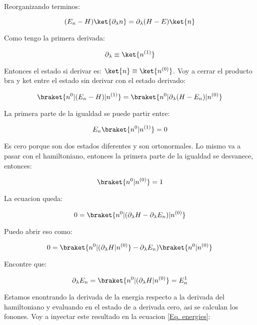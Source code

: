 \documentclass[11pt,fleqn]{book}
\begin{document}
Reorganizando terminos:

\begin{equation}
    (E_{n}-H)\ket{\partial_{\lambda}n}=\partial_{\lambda}(H-E)\ket{n}
    \label{Eq. energies}
\end{equation}

Como tengo la primera derivada:

\begin{equation*}
    \partial_{\lambda}\equiv\ket{n^{(1)}}
\end{equation*}

Entonces el estado si derivar es: $\ket{n}\equiv\ket{n^{(0)}}$. Voy a cerrar el producto bra y ket entre el estado sin derivar con el estado derivado:

\begin{equation}
    \braket{n^{0}|(E_{n}-H)|n^{(1)}}=\braket{n^{0}|\partial_{\lambda}(H-E_{n})|n^{(0)}}
\end{equation}

La primera parte de la igualdad se puede partir entre:

\begin{equation*}
    E_{n}\braket{n^{0}|n^{(1)}}=0
\end{equation*}

Es cero porque son dos estados diferentes y son ortonormales. Lo mismo va a pasar con el hamiltoniano, entonces la primera parte de la igualdad se desvanece, entonces:

\begin{equation*}
    \braket{n^{0}|n^{(0)}}=1
\end{equation*}

La ecuacion queda:

\begin{equation}
    0=\braket{n^{0}|(\partial_{\lambda}H-\partial_{\lambda}E_{n})|n^{(0)}}
\end{equation}

Puedo abrir eso como:

\begin{equation}
     0=\braket{n^{0}|(\partial_{\lambda}H|n^{(0)}}-\partial_{\lambda}E_{n})\braket{n^{0}|n^{(0)}}
\end{equation}

Encontre que:

\begin{equation}
    \partial_{\lambda}E_{n}=\braket{n^{0}|(\partial_{\lambda}H|n^{(0)}}=E_{n}^{1}
\end{equation}

Estamos enontrando la derivada de la energia respecto a la derivada del hamiltoniano y evaluando en el estado de a derivada cero, asi se calculan los fonones. Voy a inyectar este resultado en la ecuacion \ref{Eq. energies}:
\end{document}

